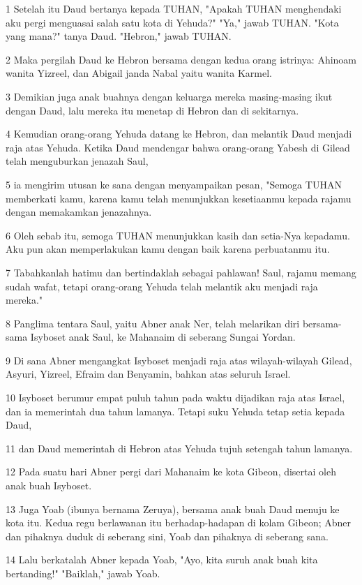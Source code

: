 \par 1 Setelah itu Daud bertanya kepada TUHAN, "Apakah TUHAN menghendaki aku pergi menguasai salah satu kota di Yehuda?" "Ya," jawab TUHAN. "Kota yang mana?" tanya Daud. "Hebron," jawab TUHAN.
\par 2 Maka pergilah Daud ke Hebron bersama dengan kedua orang istrinya: Ahinoam wanita Yizreel, dan Abigail janda Nabal yaitu wanita Karmel.
\par 3 Demikian juga anak buahnya dengan keluarga mereka masing-masing ikut dengan Daud, lalu mereka itu menetap di Hebron dan di sekitarnya.
\par 4 Kemudian orang-orang Yehuda datang ke Hebron, dan melantik Daud menjadi raja atas Yehuda. Ketika Daud mendengar bahwa orang-orang Yabesh di Gilead telah menguburkan jenazah Saul,
\par 5 ia mengirim utusan ke sana dengan menyampaikan pesan, "Semoga TUHAN memberkati kamu, karena kamu telah menunjukkan kesetiaanmu kepada rajamu dengan memakamkan jenazahnya.
\par 6 Oleh sebab itu, semoga TUHAN menunjukkan kasih dan setia-Nya kepadamu. Aku pun akan memperlakukan kamu dengan baik karena perbuatanmu itu.
\par 7 Tabahkanlah hatimu dan bertindaklah sebagai pahlawan! Saul, rajamu memang sudah wafat, tetapi orang-orang Yehuda telah melantik aku menjadi raja mereka."
\par 8 Panglima tentara Saul, yaitu Abner anak Ner, telah melarikan diri bersama-sama Isyboset anak Saul, ke Mahanaim di seberang Sungai Yordan.
\par 9 Di sana Abner mengangkat Isyboset menjadi raja atas wilayah-wilayah Gilead, Asyuri, Yizreel, Efraim dan Benyamin, bahkan atas seluruh Israel.
\par 10 Isyboset berumur empat puluh tahun pada waktu dijadikan raja atas Israel, dan ia memerintah dua tahun lamanya. Tetapi suku Yehuda tetap setia kepada Daud,
\par 11 dan Daud memerintah di Hebron atas Yehuda tujuh setengah tahun lamanya.
\par 12 Pada suatu hari Abner pergi dari Mahanaim ke kota Gibeon, disertai oleh anak buah Isyboset.
\par 13 Juga Yoab (ibunya bernama Zeruya), bersama anak buah Daud menuju ke kota itu. Kedua regu berlawanan itu berhadap-hadapan di kolam Gibeon; Abner dan pihaknya duduk di seberang sini, Yoab dan pihaknya di seberang sana.
\par 14 Lalu berkatalah Abner kepada Yoab, "Ayo, kita suruh anak buah kita bertanding!" "Baiklah," jawab Yoab.
